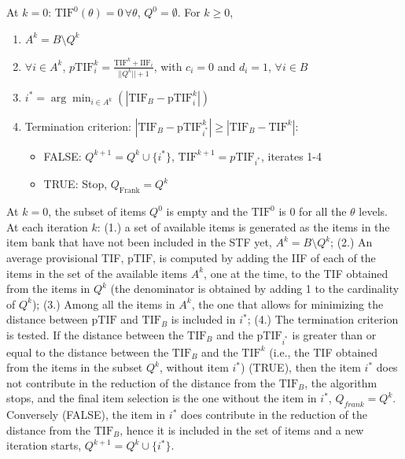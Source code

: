 \documentclass{svproc}
\begin{document}
At $k = 0$: $\text{TIF}^0(\theta) = 0 \, \forall \theta$, $Q^0 = \emptyset$. For $k \geq 0$,

\begin{enumerate}
	\item  $A^k = B \setminus Q^k$ 
	\item $\forall i \in A^k$, $p\text{TIF}_{i}^k = \frac{\text{TIF}^k + \text{IIF}_{i}}{||Q^k||+1}$, with $c_i = 0$ and $d_i = 1$, $\forall i \in B$
	\item $i^* = \arg \min_{i \in A^k} (|\text{TIF}_B - \text{pTIF}_i^k|)$
	\item Termination criterion: $|\text{TIF}_B - \text{pTIF}_{i^*}^k| \geq |\text{TIF}_B - \text{TIF}^{k}|$: 
	\begin{itemize}
		\item FALSE:  $Q^{k+1} = Q^{k} \cup \{i^*\}$, $\text{TIF}^{k+1} = p\text{TIF}_{i^*}$, iterates 1-4 
		\item TRUE: Stop, %
		$Q_{\text{Frank}} = Q^k$
		
	\end{itemize}
\end{enumerate}
At $k = 0$, the subset of items $Q^0$ is empty and the $\text{TIF}^0$ is 0 for all the $\theta$ levels. 
At each iteration $k$: (1.) a set of available items is generated as the items in the item bank that have not been included in the STF yet, $A^k = B \setminus Q^k$; (2.)
An average provisional TIF, $\text{pTIF}$, is computed by adding the IIF of each of the items in the set of the available items $A^k$, one at the time, to the TIF obtained from the items in $Q^k$ (the denominator is obtained by adding 1 to the cardinality of $Q^k$); (3.) Among all the items in $A^k$, the one that allows for minimizing the distance between $\text{pTIF}$ and $\text{TIF}_B$ is included in $i^*$; (4.) 
The termination criterion is tested. 
If the distance between the $\text{TIF}_B$ and the $\text{pTIF}_{i^*}$ is greater than or equal to the distance between the $\text{TIF}_B$ and the $\text{TIF}^k$ (i.e., the TIF obtained from the items in the subset $Q^k$, without item $i^*$) (TRUE), then the item $i^*$ does not contribute in the reduction of the distance from the $\text{TIF}_B$, the algorithm stops, and the final item selection is the one without the item in $i^*$, $Q_{frank} = Q^k$. Conversely (FALSE), the item in $i^*$ does contribute in the reduction of the distance from the $\text{TIF}_B$, hence it is included in the set of items and a new iteration starts, $Q^{k+1} = Q^k \cup \{i^*\}$.
\end{document}
